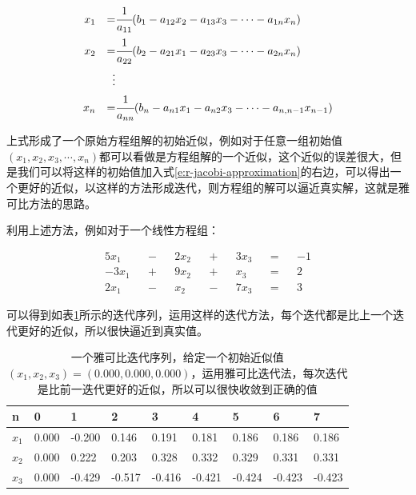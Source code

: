 \begin{equation}\label{e:r-jacobi-approximation}
\begin{aligned}
	x_1 && =     &  \cfrac{1}{a_{11}}(b_1-a_{12}x_2-a_{13}x_3-\cdots -a_{1n}x_n)\\
	x_2 && =     &  \cfrac{1}{a_{22}}(b_2-a_{21}x_1-a_{23}x_3-\cdots -a_{2n}x_n)\\
	    &&\vdots &\\
	x_n && =     &  \cfrac{1}{a_{nn}}(b_n-a_{n1}x_1-a_{n2}x_3-\cdots -a_{n,n-1}x_{n-1})\\
\end{aligned}
\end{equation}

\noindent 上式形成了一个原始方程组解的初始近似，例如对于任意一组初始值$(x_1,x_2,x_3,\cdots,x_n)$都可以看做是方程组解的一个近似，这个近似的误差很大，但是我们可以将这样的初始值加入式\ref{e:r-jacobi-approximation}的右边，可以得出一个更好的近似，以这样的方法形成迭代，则方程组的解可以逼近真实解，这就是雅可比方法的思路。

利用上述方法，例如对于一个线性方程组：

\begin{equation}
\begin{aligned}
	5x_1  && - && 2x_2 && + && 3x_3 && = && -1\\
	-3x_1 && + && 9x_2 && + && x_3  && = && 2\\
	2x_1  && - && x_2  && - && 7x_3 && = && 3
\end{aligned}
\end{equation}

可以得到如表\ref{t:r-jacobi-iteration}所示的迭代序列，运用这样的迭代方法，每个迭代都是比上一个迭代更好的近似，所以很快逼近到真实值。

\begin{table}
\caption{一个雅可比迭代序列，给定一个初始近似值$(x_1,x_2,x_3)=(0.000,0.000,0.000)$，运用雅可比迭代法，每次迭代是比前一迭代更好的近似，所以可以很快收敛到正确的值}
\label{t:r-jacobi-iteration}
\begin{tabular}{p{}|p{}|p{}|p{}|p{}|p{}|p{}|p{}|p{}}
\hline 
   n & 0 & 1 & 2 & 3& 4& 5 &6 & 7 \\
    \hline  
  $x_1$ & 0.000 & -0.200 & 0.146  & 0.191  & 0.181  & 0.186  & 0.186  & 0.186\\
  $x_2$ & 0.000 & 0.222  & 0.203  & 0.328  & 0.332  & 0.329  & 0.331  & 0.331\\
  $x_3$ & 0.000 & -0.429 & -0.517 & -0.416 & -0.421 & -0.424 & -0.423 & -0.423\\
 \hline 
\end{tabular}
\end{table}




